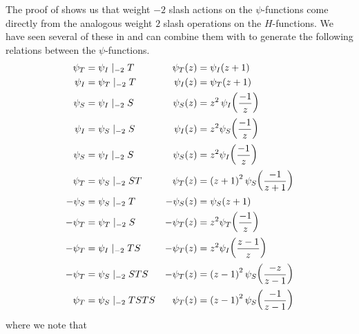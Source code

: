 The proof of  shows us that weight $-2$ slash actions on the $\psi$-functions come directly from the analogous weight $2$ slash operations on the $H$-functions. We have seen several of these in  and can combine them with  to generate the following relations between the $\psi$-functions.
\begin{align}
    \psi_T &= \psi_I \mid_{-2} T &
    \psi_T(z) &= \psi_I\of{z + 1}
    \label{Ch4:Eq:psi_T_eq_psi_I_add_one}
    \\
    \psi_I &= \psi_T \mid_{-2} T &
    \psi_I(z) &= \psi_T\of{z + 1}
    \label{Ch4:Eq:psi_I_eq_psi_T_add_one}
    \\
    \psi_S &= \psi_I \mid_{-2} S &
    \psi_S(z) &= z^2 \, \psi_I\of{\frac{-1}{z}}
    \label{Ch4:Eq:psi_S_eq_zsq_mul_psi_I_neg_inv}
    \\
    \psi_I &= \psi_S \mid_{-2} S &
    \psi_I(z) &= z^2 \psi_S\of{\frac{-1}{z}}
    \label{Ch4:Eq:psi_I_to_psi_S}
    \\
    \psi_S &= \psi_I \mid_{-2} S &
    \psi_S(z) &= z^2 \psi_I\of{\frac{-1}{z}}
    \label{Ch4:Eq:psi_S_to_psi_I}
    \\
    \psi_T &= \psi_S \mid_{-2} ST &
    \psi_T(z) &= \parenth{z+1}^2 \psi_S\of{\frac{-1}{z+1}}
    \label{Ch4:Eq:psi_T_to_psi_S_add}
    \\
    -\psi_{S} &= \psi_S \mid_{-2} T &
    -\psi_S(z) &= \psi_S(z + 1)
    \label{Ch4:Eq:psi_S_one_periodic}
    \\
    - \psi_{T} &= \psi_T \mid_{-2} S &
    - \psi_T(z) &= z^2 \psi_T\of{\frac{-1}{z}} \label{Ch4:Eq:psi_T_eq_zsq_mul_psi_T_neg_inv}
    \\
    - \psi_{T} &= \psi_I \mid_{-2} TS &
    - \psi_T(z) &= z^2 \psi_I\of{\frac{z - 1}{z}}
    \label{Ch4:Eq:psi_T_eq_neg_psi_I_slash_TS}
    \\
    - \psi_{T} &= \psi_S \mid_{-2} STS &
    - \psi_T(z) &= \parenth{z - 1}^2 \psi_S\of{\frac{-z}{z - 1}}
    \label{Ch4:Eq:psi_T_eq_neg_psi_S_slash_STS}
    \\
    \psi_{T} &= \psi_S \mid_{-2} TSTS &
    \psi_T(z) &= \parenth{z - 1}^2 \psi_S\of{\frac{-1}{z - 1}}
    \label{Ch4:Eq:psi_T_as_psi_S_for_J3_J4}
\end{align}
where we note that
